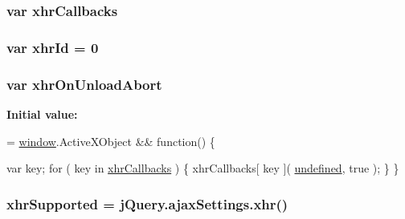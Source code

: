 \subsubsection[{xhr\+Callbacks}]{\setlength{\rightskip}{0pt plus 5cm}var xhr\+Callbacks}\label{_bibabook_2_scripts_2jquery-1_810_82_8js_a068f27a70831ff3a9e0ffa79e063847f}
\hypertarget{_bibabook_2_scripts_2jquery-1_810_82_8js_aa23ed64cf7afc9b028419517bf23fcea}{}
\subsubsection[{xhr\+Id}]{\setlength{\rightskip}{0pt plus 5cm}var xhr\+Id = 0}\label{_bibabook_2_scripts_2jquery-1_810_82_8js_aa23ed64cf7afc9b028419517bf23fcea}
\hypertarget{_bibabook_2_scripts_2jquery-1_810_82_8js_a271c099ab18ab35c15cac2faa2a097aa}{}
\subsubsection[{xhr\+On\+Unload\+Abort}]{\setlength{\rightskip}{0pt plus 5cm}var xhr\+On\+Unload\+Abort}\label{_bibabook_2_scripts_2jquery-1_810_82_8js_a271c099ab18ab35c15cac2faa2a097aa}
{\bfseries Initial value\+:}
\begin{DoxyCode}
= \hyperlink{_bibabook_2_scripts_2jquery-1_810_82_8js_a04a8a2bbfa9c15500892b8e5033d625b}{window}.ActiveXObject && \textcolor{keyword}{function}() \{
        
        var key;
        \textcolor{keywordflow}{for} ( key in \hyperlink{_bibabook_2_scripts_2jquery-1_810_82_8js_a068f27a70831ff3a9e0ffa79e063847f}{xhrCallbacks} ) \{
            xhrCallbacks[ key ]( \hyperlink{_bibabook_2_scripts_2jquery-1_810_82_8js_a08113a236cc18d2a9d5ce27e638012be}{undefined}, true );
        \}
    \}
\end{DoxyCode}
\hypertarget{_bibabook_2_scripts_2jquery-1_810_82_8js_afd7e72f2f357a5a8b17e46776a6283eb}{}
\subsubsection[{xhr\+Supported}]{\setlength{\rightskip}{0pt plus 5cm}xhr\+Supported = {\bf j\+Query.\+ajax\+Settings.\+xhr}()}\label{_bibabook_2_scripts_2jquery-1_810_82_8js_afd7e72f2f357a5a8b17e46776a6283eb}
